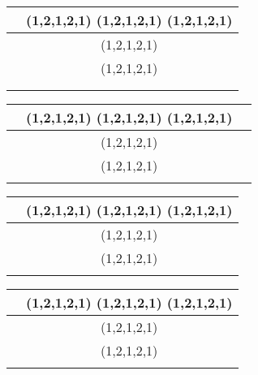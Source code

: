 \documentclass{article}
\begin{document}
\begin{table}[]
\begin{tabular}{|c|c|}
\hline
 & (1,2,1,2,1) (1,2,1,2,1) (1,2,1,2,1) \\ \hline
 & (1,2,1,2,1)                         \\ \hline
 & (1,2,1,2,1)                         \\ \hline
 &                                     \\ \hline
&                                     \\ \hline
\end{tabular}
\end{table}
\begin{table}[]
\begin{tabular}{|c|c|c|}
\hline
 & (1,2,1,2,1) (1,2,1,2,1) (1,2,1,2,1)& \\ \hline
 & (1,2,1,2,1)&                         \\ \hline
 & (1,2,1,2,1)&                         \\ \hline
 &            &                         \\ \hline
\end{tabular}
\end{table}
\begin{table}[]
\begin{tabular}{|c|c|}
\hline
 & (1,2,1,2,1) (1,2,1,2,1) (1,2,1,2,1) \\ \hline
 & (1,2,1,2,1)                         \\ \hline
 & (1,2,1,2,1)                         \\ \hline
 &                                     \\ \hline
\end{tabular}
\end{table}
\begin{table}[]
\begin{tabular}{|c|c|}
\hline
 & (1,2,1,2,1) (1,2,1,2,1) (1,2,1,2,1) \\ \hline
 & (1,2,1,2,1)                         \\ \hline
 & (1,2,1,2,1)                         \\ \hline
 &                                     \\ \hline
\end{tabular}
\end{table}
\end{document}
